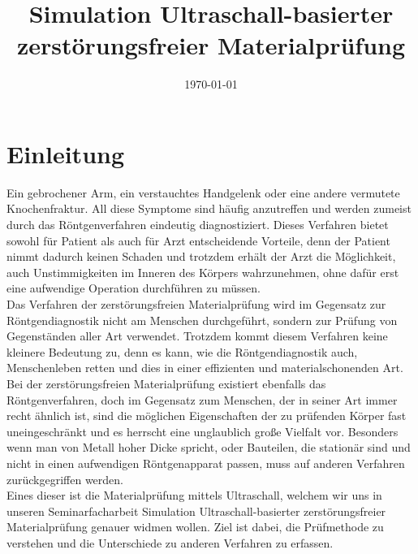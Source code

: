 \documentclass[reducespace,stylepage,semiarbeit]{spezidoc}
\title{Simulation Ultraschall-basierter zerstörungsfreier Materialprüfung}
\date{\today}
\begin{document}
\maketitlepage
\newpage


\tableofcontents
\thispagestyle{empty}
\newpage

\setcounter{page}{1}

\section{Einleitung}
Ein gebrochener Arm, ein verstauchtes Handgelenk oder eine andere vermutete Knochenfraktur. All diese Symptome sind häufig anzutreffen und werden zumeist durch das Röntgenverfahren eindeutig diagnostiziert. Dieses Verfahren bietet sowohl für Patient als auch für Arzt entscheidende Vorteile, denn der Patient nimmt dadurch keinen Schaden und trotzdem erhält der Arzt die Möglichkeit, auch Unstimmigkeiten im Inneren des Körpers wahrzunehmen, ohne dafür erst eine aufwendige Operation durchführen zu müssen.\\
Das Verfahren der zerstörungsfreien Materialprüfung wird im Gegensatz zur Röntgendiagnostik nicht am Menschen durchgeführt, sondern zur Prüfung von Gegenständen aller Art verwendet. Trotzdem kommt diesem Verfahren keine kleinere Bedeutung zu, denn es kann, wie die Röntgendiagnostik auch, Menschenleben retten und dies in einer effizienten und materialschonenden Art.\\
Bei der zerstörungsfreien Materialprüfung existiert ebenfalls das Röntgenverfahren, doch im Gegensatz zum Menschen, der in seiner Art immer recht ähnlich ist, sind die möglichen Eigenschaften der zu prüfenden Körper fast uneingeschränkt und es herrscht eine unglaublich große Vielfalt vor. Besonders wenn man von Metall hoher Dicke spricht, oder Bauteilen, die stationär sind und nicht in einen aufwendigen Röntgenapparat passen, muss auf anderen Verfahren zurückgegriffen werden.\\
Eines dieser ist die Materialprüfung mittels Ultraschall, welchem wir uns in unseren Seminarfacharbeit Simulation Ultraschall-basierter zerstörungsfreier Materialprüfung genauer widmen wollen. Ziel ist dabei, die Prüfmethode zu verstehen und die Unterschiede zu anderen Verfahren zu erfassen.\\
\end{document}
